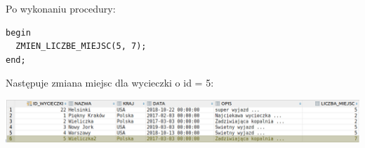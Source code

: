 Po wykonaniu procedury:
\begin{verbatim}
begin
  ZMIEN_LICZBE_MIEJSC(5, 7);
end;
\end{verbatim}
Następuje zmiana miejsc dla wycieczki o id = 5:

\includegraphics[width=\linewidth]{./images/zmien_liczbe_miejsc.png}
